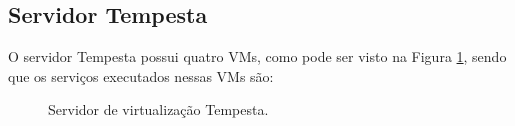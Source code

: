 \subsection{Servidor Tempesta}
\label{section:serv_tempesta}

O servidor Tempesta possui quatro \ac{VM}s, como pode ser visto na Figura \ref{fig:servidor_tempesta}, sendo que os serviços executados nessas 
\ac{VM}s são:

\begin{figure}[h!]
 \centering
 \caption{Servidor de virtualização Tempesta.}
 \label{fig:servidor_tempesta}
\end{figure}

